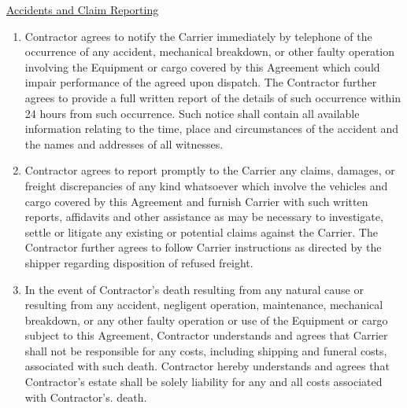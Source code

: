 \underline{Accidents and Claim Reporting}
\begin{enumerate}[
    ref = \SecondLevelEnumerator
]
    \item Contractor agrees to notify the Carrier immediately by telephone
    of the occurrence of any accident, mechanical breakdown, or other
    faulty operation involving the Equipment or cargo covered by this
    Agreement which could impair performance of the agreed upon dispatch.
    The Contractor further agrees to provide a full written report of the
    details of such occurrence within 24 hours from such occurrence. Such
    notice shall contain all available information relating to the time,
    place and circumstances of the accident and the names and addresses of
    all witnesses.

    \item Contractor agrees to report promptly to the Carrier any claims,
    damages, or freight discrepancies of any kind whatsoever which involve
    the vehicles and cargo covered by this Agreement and furnish Carrier
    with such written reports, affidavits and other assistance as may be
    necessary to investigate, settle or litigate any existing or potential
    claims against the Carrier. The Contractor further agrees to follow
    Carrier instructions as directed by the shipper regarding disposition
    of refused freight.

    \item In the event of Contractor's death resulting from any natural
    cause or resulting from any accident, negligent operation, maintenance,
    mechanical breakdown, or any other faulty operation or use of the
    Equipment or cargo subject to this Agreement, Contractor understands
    and agrees that Carrier shall not be responsible for any costs,
    including shipping and funeral costs, associated with such death.
    Contractor hereby understands and agrees that Contractor's estate shall
    be solely liability for any and all costs associated with Contractor's.
    death.
\end{enumerate}